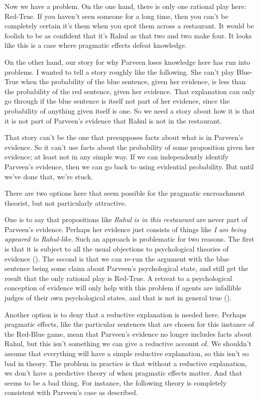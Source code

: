 \documentclass[
  10pt,
  letterpaper,
  DIV=11,
  numbers=noendperiod,
  twoside]{scrartcl}
\begin{document}
Now we have a problem. On the one hand, there is only one rational play
here: Red-True. If you haven't seen someone for a long time, then you
can't be completely certain it's them when you spot them across a
restaurant. It would be foolish to be as confident that it's Rahul as
that two and two make four. It looks like this is a case where pragmatic
effects defeat knowledge.

On the other hand, our story for why Parveen loses knowledge here has
run into problems. I wanted to tell a story roughly like the following.
She can't play Blue-True when the probability of the blue sentence,
given her evidence, is less than the probability of the red sentence,
given her evidence. That explanation can only go through if the blue
sentence is itself not part of her evidence, since the probability of
anything given itself is one. So we need a story about how it is that it
is not part of Parveen's evidence that Rahul is not in the restaurant.

That story can't be the one that presupposes facts about what is in
Parveen's evidence. So it can't use facts about the probability of some
proposition given her evidence; at least not in any simple way. If we
can independently identify Parveen's evidence, then we can go back to
using evidential probability. But until we've done that, we're stuck.

There are two options here that seem possible for the pragmatic
encroachment theorist, but not particularly attractive.

One is to say that propositions like \emph{Rahul is in this restaurant}
are never part of Parveen's evidence. Perhaps her evidence just consists
of things like \emph{I am being appeared to Rahul-like}. Such an
approach is problematic for two reasons. The first is that it is subject
to all the usual objections to psychological theories of evidence
(). The second
is that we can re-run the argument with the blue sentence being some
claim about Parveen's psychological state, and still get the result that
the only rational play is Red-True. A retreat to a psychological
conception of evidence will only help with this problem if agents are
infallible judges of their own psychological states, and that is not in
general true ().

Another option is to deny that a reductive explanation is needed here.
Perhaps pragmatic effects, like the particular sentences that are chosen
for this instance of the Red-Blue game, mean that Parveen's evidence no
longer includes facts about Rahul, but this isn't something we can give
a reductive account of. We shouldn't assume that everything will have a
simple reductive explanation, so this isn't so bad in theory. The
problem in practice is that without a reductive explanation, we don't
have a predictive theory of when pragmatic effects matter. And that
seems to be a bad thing. For instance, the following theory is
completely consistent with Parveen's case as described.
\end{document}
